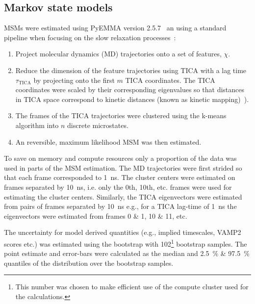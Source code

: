 \documentclass[journal=jacsat,manuscript=article]{achemso}
\begin{document}
\subsection{Markov state models}
MSMs were estimated using PyEMMA version 2.5.7~\cite{schererPyEMMASoftwarePackage2015a} an using a standard pipeline when focusing on the slow relaxation processes~\cite{noe_markov_2019, husic_markov_2018}: 
\begin{enumerate}
    \item Project molecular dynamics (MD) trajectories onto a set of features, $\chi$. 
    \item Reduce the dimension of the feature trajectories using TICA with a lag time $\tau_{\mathrm{TICA}}$ by projecting onto the first $m$ TICA coordinates. The TICA coordinates were scaled by their corresponding eigenvalues so that distances in  TICA space correspond to kinetic distances (known as kinetic mapping)~\cite{noeKineticDistanceKinetic2015}).
    \item The frames of the TICA trajectories were clustered using the k-means algorithm into $n$ discrete microstates. 
    \item An reversible, maximum likelihood MSM was then estimated. 
\end{enumerate}
To save on memory and compute resources only a proportion of the data was used in parts of the MSM estimation. The MD trajectories were first strided so that each frame corresponded to \SI{1}{\nano\second}. The cluster centers were estimated on frames separated by \SI{10}{\nano\second}, i.e. only the 0th, 10th, etc. frames were used for estimating the cluster centers. Similarly, the TICA eigenvectors were estimated from pairs of frames separated by \SI{10}{\nano\second} e.g., for a TICA lag-time of \SI{1}{\nano\second} the eigenvectors were estimated from frames 0 \& 1, 10 \& 11, etc. 

The uncertainty for model derived quantities (e.g., implied timescales, VAMP2 scores etc.) was estimated using the bootstrap with \num{102}\footnote{This number was chosen to make efficient use of the compute cluster used for the calculations.} bootstrap samples. The point estimate and error-bars  were calculated as the median and  \SI{2.5}{\percent} \& \SI{97.5}{\percent} quantiles of the distribution over the bootstrap samples.
\end{document}
